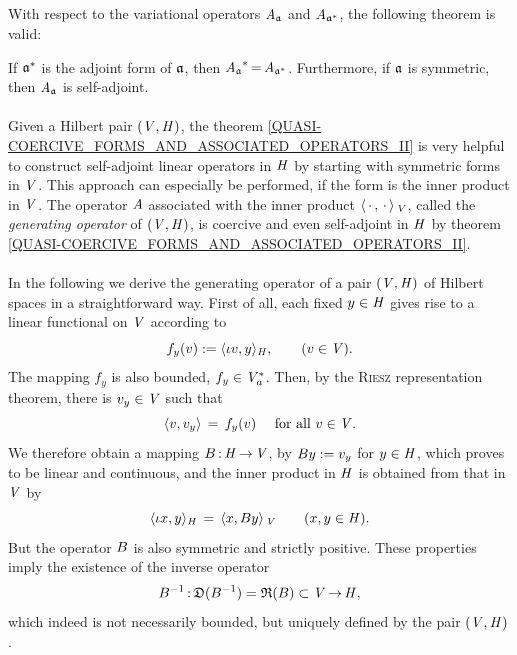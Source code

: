 \documentclass[11pt,twoside]{article}
\begin{document}
\subparagraph*{} %
With respect to the variational operators $\mathit{A}_{\mathfrak{a}}$ and $\mathit{A}_{\mathfrak{a}^*}$,
the following theorem is valid:

\begin{theorem}\label{QUASI-COERCIVE_FORMS_AND_ASSOCIATED_OPERATORS_II}
If $\mathfrak{a}^*$ is the adjoint form of $\mathfrak{a}$,
then ${\mathit{A}_{\mathfrak{a}}}^* {\,=\,} \mathit{A}_{\mathfrak{a}^*}$.
Furthermore,
if $\mathfrak{a}$ is symmetric,
then $\mathit{A}_{\mathfrak{a}}$ is self-adjoint.
\end{theorem}

\paragraph*{} %
Given a Hilbert pair $(\mathit{V},\mathit{H})$,
the theorem \ref{QUASI-COERCIVE_FORMS_AND_ASSOCIATED_OPERATORS_II}
is very helpful to construct self-adjoint linear operators in $\mathit{H}$
by starting with symmetric forms in $\mathit{V}$.
This approach can especially be performed,
if the form is the inner product in $\mathit{V}$.
The operator $\mathit{A}$ associated with the inner product
$\langle \,\cdot\,,\,\cdot\, \rangle_{\,\mathit{V}}$,
called the \textit{generating operator} of $(\mathit{V},\mathit{H})$,
is coercive and even self-adjoint in $\mathit{H}$
by theorem \ref{QUASI-COERCIVE_FORMS_AND_ASSOCIATED_OPERATORS_II}.

\paragraph*{} %
In the following we derive the generating operator
of a pair $(\mathit{V},\mathit{H})$ of Hilbert spaces in a straightforward way.
First of all,
each fixed $y \in \mathit{H}$
gives rise to a linear functional on $\mathit{V}$ according to
\[
f_y(v) := \langle \iota v,y \rangle_{\mathit{H}}, \quad \quad (v \in \mathit{V}).
\]
The mapping $f_y$ is also bounded,
{\ie} $f_y \in \mathit{V}_a^*$.
Then,
by the \textsc{Riesz} representation theorem,
there is $v_y \in \mathit{V}$ such that
\[
\langle v,v_y \rangle \,=\, f_y(v) \quad \mbox{ for all } v \in \mathit{V}.
\]
We therefore obtain a mapping ${B}{\,:\,}\mathit{H} {\,\to\,} \mathit{V}$,
by ${B} y := v_y$ for $y \in \mathit{H}$,
which proves to be linear and continuous,
and the inner product in $\mathit{H}$ is obtained from that in $\mathit{V}$ by
\[
\langle \iota x,y \rangle_{\mathit{H}} \,=\, \langle x,{B} y \rangle_{\,\mathit{V}}
\quad \quad (x,y \in \mathit{H}).
\]
But the operator ${B}$ is also symmetric and strictly positive.
These properties imply the existence of the inverse operator
\[
{B}^{-1}{\,:\,}\mathfrak{D}({B}^{-1} ) = \mathfrak{R}({B}) \subset \mathit{V} {\,\to\,} \mathit{H},
\]
which indeed is not necessarily bounded,
but uniquely defined by the pair $(\mathit{V},\mathit{H})$.
\end{document}

